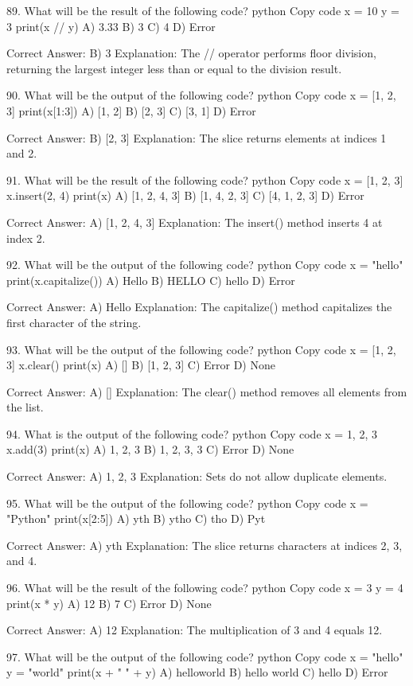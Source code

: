 89. What will be the result of the following code?
python
Copy code
x = 10
y = 3
print(x // y)
A) 3.33
B) 3
C) 4
D) Error

Correct Answer: B) 3
Explanation: The // operator performs floor division, returning the largest integer less than or equal to the division result.

90. What will be the output of the following code?
python
Copy code
x = [1, 2, 3]
print(x[1:3])
A) [1, 2]
B) [2, 3]
C) [3, 1]
D) Error

Correct Answer: B) [2, 3]
Explanation: The slice returns elements at indices 1 and 2.

91. What will be the result of the following code?
python
Copy code
x = [1, 2, 3]
x.insert(2, 4)
print(x)
A) [1, 2, 4, 3]
B) [1, 4, 2, 3]
C) [4, 1, 2, 3]
D) Error

Correct Answer: A) [1, 2, 4, 3]
Explanation: The insert() method inserts 4 at index 2.

92. What will be the output of the following code?
python
Copy code
x = "hello"
print(x.capitalize())
A) Hello
B) HELLO
C) hello
D) Error

Correct Answer: A) Hello
Explanation: The capitalize() method capitalizes the first character of the string.

93. What will be the output of the following code?
python
Copy code
x = [1, 2, 3]
x.clear()
print(x)
A) []
B) [1, 2, 3]
C) Error
D) None

Correct Answer: A) []
Explanation: The clear() method removes all elements from the list.

94. What is the output of the following code?
python
Copy code
x = {1, 2, 3}
x.add(3)
print(x)
A) {1, 2, 3}
B) {1, 2, 3, 3}
C) Error
D) None

Correct Answer: A) {1, 2, 3}
Explanation: Sets do not allow duplicate elements.

95. What will be the output of the following code?
python
Copy code
x = "Python"
print(x[2:5])
A) yth
B) ytho
C) tho
D) Pyt

Correct Answer: A) yth
Explanation: The slice returns characters at indices 2, 3, and 4.

96. What will be the result of the following code?
python
Copy code
x = 3
y = 4
print(x * y)
A) 12
B) 7
C) Error
D) None

Correct Answer: A) 12
Explanation: The multiplication of 3 and 4 equals 12.

97. What will be the output of the following code?
python
Copy code
x = "hello"
y = "world"
print(x + " " + y)
A) helloworld
B) hello world
C) hello
D) Error

